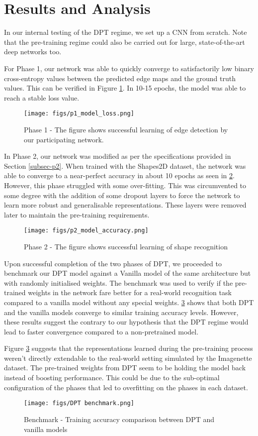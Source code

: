 \section{Results and Analysis}
In our internal testing of the DPT regime, we set up a CNN from scratch. Note that the pre-training regime could also be carried out for large, state-of-the-art deep networks too.

For Phase 1, our network was able to quickly converge to satisfactorily low binary cross-entropy values between the predicted edge maps and the ground truth values. This can be verified in Figure \ref{fig:fig2}. In 10-15 epochs, the model was able to reach a stable loss value.
\begin{figure}
  \centering
  \texttt{[image: figs/p1\_model\_loss.png]}
  \caption{Phase 1 - The figure shows successful learning of edge detection by our participating network.} 
  \label{fig:fig2}
\end{figure}

In Phase 2, our network was modified as per the specifications provided in Section \ref{subsec-p2}. When trained with the Shapes2D dataset, the network was able to converge to a near-perfect accuracy in about 10 epochs as seen in \ref{fig:fig3}. However, this phase struggled with some over-fitting. This was circumvented to some degree with the addition of some dropout layers \cite{srivastava2014dropout} to force the network to learn more robust and generalisable representations. These layers were removed later to maintain the pre-training requirements.

\begin{figure}
  \centering
  \texttt{[image: figs/p2\_model\_accuracy.png]}
  \caption{Phase 2 - The figure shows successful learning of shape recognition} 
  \label{fig:fig3}
\end{figure}

Upon successful completion of the two phases of DPT, we proceeded to benchmark our DPT model against a Vanilla model of the same architecture but with randomly initialised weights. The benchmark was used to verify if the pre-trained weights in the network fare better for a real-world recognition task compared to a vanilla model without any special weights. \ref{fig:fig4} shows that both DPT and the vanilla models converge to similar training accuracy levels. However, these results suggest the contrary to our hypothesis that the DPT regime would lead to faster convergence compared to a non-pretrained model. 

Figure \ref{fig:fig4} suggests that the representations learned during the pre-training process weren't directly extendable to the real-world setting simulated by the Imagenette dataset. The pre-trained weights from DPT seem to be holding the model back instead of boosting performance. This could be due to the sub-optimal configuration of the phases that led to overfitting on the phases in each dataset.

\begin{figure}
  \centering
  \texttt{[image: figs/DPT benchmark.png]}
  \caption{Benchmark - Training accuracy comparison between DPT and vanilla models} 
  \label{fig:fig4}
\end{figure}